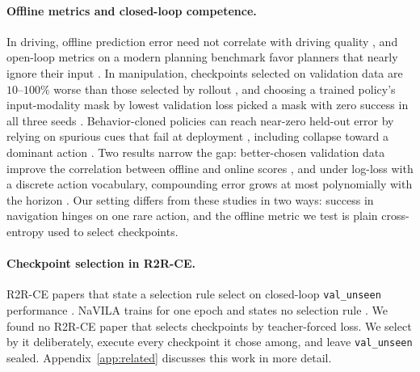 \paragraph{Offline metrics and closed-loop competence.} In driving, offline prediction error need
not correlate with driving quality \citep{codevilla2018offline}, and open-loop metrics on a modern
planning benchmark favor planners that nearly ignore their input \citep{dauner2023parting}. In
manipulation, checkpoints selected on validation data are $10$--$100\%$ worse than those selected by
rollout \citep{mandlekar2021robomimic}, and choosing a trained policy's input-modality mask by
lowest validation loss picked a mask with zero success in all three seeds \citep{hao2023masked}.
Behavior-cloned policies can reach near-zero held-out error by relying on spurious cues that fail at
deployment \citep{dehaan2019causal}, including collapse toward a dominant action
\citep{codevilla2019exploring}. Two results narrow the gap: better-chosen validation data improve
the correlation between offline and online scores \citep{codevilla2018offline}, and under log-loss
with a discrete action vocabulary, compounding error grows at most polynomially with the horizon
\citep{foster2024behavior}. Our setting differs from these studies in two ways: success in
navigation hinges on one rare action, and the offline metric we test is plain cross-entropy used to
select checkpoints.

\paragraph{Checkpoint selection in R2R-CE.} R2R-CE papers that state a selection rule select on
closed-loop \texttt{val\_unseen} performance \citep{krantz2020beyond}. NaVILA trains for one epoch
and states no selection rule \citep{cheng2025navila}. We found no R2R-CE paper that selects
checkpoints by teacher-forced loss. We select by it deliberately, execute every checkpoint it chose
among, and leave \texttt{val\_unseen} sealed. Appendix~\ref{app:related} discusses this work in
more detail.
